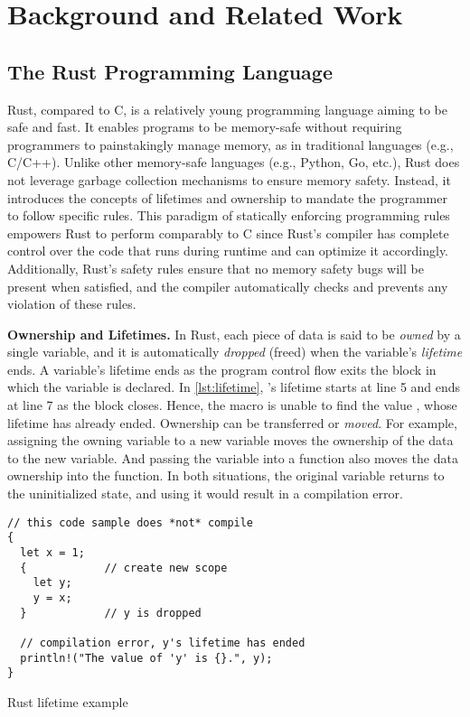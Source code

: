 
\chapter{Background and Related Work}

\section{The Rust Programming Language}
Rust, compared to C,
is a relatively young programming language aiming to be safe and fast.
It enables programs to be memory-safe without requiring programmers to
painstakingly manage memory, as in traditional languages (e.g., C/C++).
Unlike other memory-safe languages (e.g., Python, Go, etc.),
Rust does not leverage garbage collection mechanisms
to ensure memory safety.
Instead, it introduces the concepts of lifetimes and ownership
to mandate the programmer to follow specific rules.
This paradigm of statically enforcing programming rules
empowers Rust to perform comparably to C since Rust's compiler has complete
control over the code that
runs during runtime and can optimize it accordingly.
Additionally, Rust's safety rules ensure that
no memory safety bugs will be present when satisfied,
and the compiler automatically checks and prevents any violation of these rules.

\textbf{Ownership and Lifetimes.}
In Rust, each piece of data is said to be \textit{owned} by a single
variable, and it is automatically \textit{dropped} (freed) when the
variable's \textit{lifetime} ends. A variable's lifetime ends as the program
control flow exits the block in which the variable is declared.
In \autoref{lst:lifetime}, 's lifetime starts at line 5 and ends at
line 7 as the block closes. Hence, the  macro is unable to find
the value , whose lifetime has already ended.
Ownership can be transferred or \textit{moved}. For example,
assigning the owning variable to a new variable moves the ownership of the
data to the new variable. And passing the variable into a function also moves
the data ownership into the function.
In both situations, the original variable returns to the uninitialized state,
and using it would result in a compilation error.

\begin{listing}[hbtp]
    \begin{verbatim}
// this code sample does *not* compile
{
  let x = 1;
  {            // create new scope
    let y;
    y = x;
  }            // y is dropped

  // compilation error, y's lifetime has ended
  println!("The value of 'y' is {}.", y);
}
    \end{verbatim}
    \caption{Rust lifetime example}
    \label{lst:lifetime}
    \vspace{-0.2cm}
\end{listing}

